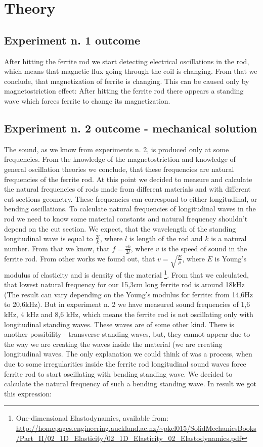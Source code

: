 \documentclass[10pt,a4paper]{article}
\begin{document}
\newpage
\section{Theory}
\subsection{Experiment n. 1 outcome}
After hitting the ferrite rod we start detecting electrical oscillations in the rod, which means that magnetic flux going through the coil is changing. From that we conclude, that magnetization of ferrite is changing. This can be caused only by magnetostriction effect: After hitting the ferrite rod there appears a standing wave which forces ferrite to change its magnetization.
\subsection{Experiment n. 2 outcome - mechanical solution}
The sound, as we know from experiments n. 2, is produced only at some frequencies. From the knowledge of the magnetostriction and knowledge of general oscillation theories we conclude, that these frequencies are natural frequencies of the ferrite rod. At this point we decided to measure and calculate the natural frequencies of rods made from different materials and with different cut sections geometry. These frequencies can correspond to  either longitudinal, or bending oscillations. To calculate natural frequencies of longitudinal waves in the rod we need to know some material constants and natural frequency shouldn’t depend on the cut section. 
We expect, that the wavelength of the standing longitudinal wave is equal to $\frac{2l}{k}$, where $l$ is length of the rod and $k$ is a natural number. 
From that we know, that $f=\frac{vk}{2l}$, where $v$ is the speed of sound in the ferrite rod. 
From other works we found out, that $v=\sqrt{\frac{E}{\rho}}$, where $E$ is Young's modulus of elasticity and  is density of the material
\footnote{One-dimensional Elastodynamics, available from: \url{http://homepages.engineering.auckland.ac.nz/~pkel015/SolidMechanicsBooks/Part_II/02_1D_Elasticity/02_1D_Elasticity_02_Elastodynamics.pdf}}.
From that we calculated, that lowest natural frequency for our 15,3cm long ferrite rod is around 18kHz (The result can vary depending on the Young's modulus for ferrite: from 14,6Hz to 20,6kHz). But in experiment n. 2 we have measured sound frequencies of 1,6 kHz, 4 kHz and 8,6 kHz, which means the ferrite rod is not oscillating only with longitudinal standing waves. These waves are of some other kind. There is another possibility - transverse standing waves, but, they cannot appear due to the way we are creating the waves inside the material (we are creating longitudinal waves. The only explanation we could think of was a process, when due to some irregularities inside the ferrite rod longitudinal sound waves force ferrite rod to start oscillating with bending standing wave. We decided to calculate the natural frequency of such a bending standing wave. In result we got this expression:
\end{document}

